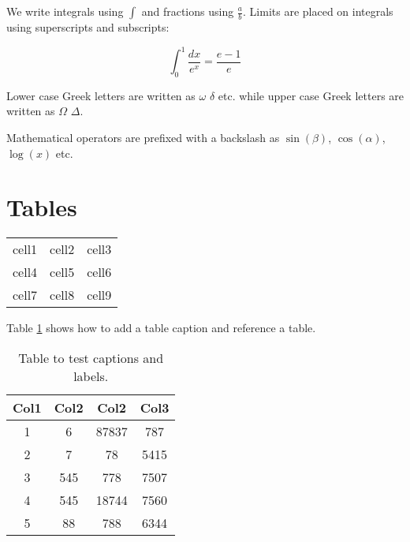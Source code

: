 \documentclass[12pt, a4paper]{article} %
\begin{document}
        We write integrals using $\int$ and fractions using $\frac{a}{b}$. Limits are placed on integrals using superscripts and subscripts:

        \[ \int_0^1 \frac{dx}{e^x} =  \frac{e-1}{e} \]

        Lower case Greek letters are written as $\omega$ $\delta$ etc. while upper case Greek letters are written as $\Omega$ $\Delta$.

        Mathematical operators are prefixed with a backslash as $\sin(\beta)$, $\cos(\alpha)$, $\log(x)$ etc.

    \section{Tables}
        \begin{center}
            \begin{tabular}{c c c}       %
                cell1 & cell2 & cell3 \\ %
                cell4 & cell5 & cell6 \\
                cell7 & cell8 & cell9
            \end{tabular}
        \end{center}

        Table \ref{table:data} shows how to add a table caption and reference a table.

        \begin{table}[h!]
            \centering
            \begin{tabular}{||c|c|c|c||}             %
                \hline                               %
                Col1 & Col2 & Col2 & Col3 \\ [0.5ex]
                \hline\hline
                1 & 6 & 87837 & 787 \\
                \hline
                2 & 7 & 78 & 5415 \\
                \hline
                3 & 545 & 778 & 7507 \\
                \hline
                4 & 545 & 18744 & 7560 \\
                \hline
                5 & 88 & 788 & 6344 \\ [1ex]
                \hline
            \end{tabular}
            \caption{Table to test captions and labels.}
            \label{table:data}
        \end{table}
\end{document}
